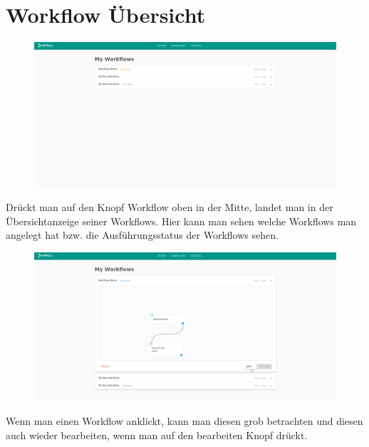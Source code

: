 \chapter{Workflow Übersicht}
    \begin{figure}[H]
        \centering
        \includegraphics[width=15.5cm]{images/Workflow Overview.png}
        \label{workflow_overview}
    \end{figure}
    Drückt man auf den Knopf Workflow oben in der Mitte, landet man in der Übersichtanzeige seiner Workflows. Hier kann man sehen welche Workflows man angelegt hat bzw. die Ausführungsstatus der Workflows sehen.
    \begin{figure}[H]
        \centering
        \includegraphics[width=15.5cm]{images/Choose Workflow.png}
        \label{choose_workflow}
    \end{figure}
    Wenn man einen Workflow anklickt, kann man diesen grob betrachten und diesen auch wieder bearbeiten, wenn man auf den bearbeiten Knopf drückt. 
    
